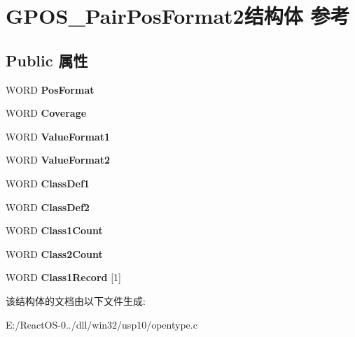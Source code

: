 \hypertarget{struct_g_p_o_s___pair_pos_format2}{}\section{G\+P\+O\+S\+\_\+\+Pair\+Pos\+Format2结构体 参考}
\label{struct_g_p_o_s___pair_pos_format2}
\subsection*{Public 属性}
\begin{DoxyCompactItemize}
\item 
\mbox{\label{struct_g_p_o_s___pair_pos_format2_a504959990c024546b68958e54cce5a03}} 
W\+O\+RD {\bfseries Pos\+Format}
\item 
\mbox{\label{struct_g_p_o_s___pair_pos_format2_a4a00fdc63eafb83e72490c04d5518b68}} 
W\+O\+RD {\bfseries Coverage}
\item 
\mbox{\label{struct_g_p_o_s___pair_pos_format2_af3979ab5cfe332226592ea0bc3e7ff12}} 
W\+O\+RD {\bfseries Value\+Format1}
\item 
\mbox{\label{struct_g_p_o_s___pair_pos_format2_a941d191d3abefa044a5f37ba96f48a50}} 
W\+O\+RD {\bfseries Value\+Format2}
\item 
\mbox{\label{struct_g_p_o_s___pair_pos_format2_a6f98a61a237d4c25869032eb7a8213af}} 
W\+O\+RD {\bfseries Class\+Def1}
\item 
\mbox{\label{struct_g_p_o_s___pair_pos_format2_ab7b6b67848b5fe52f2e373a9cb4209fd}} 
W\+O\+RD {\bfseries Class\+Def2}
\item 
\mbox{\label{struct_g_p_o_s___pair_pos_format2_a6c9fb8d6aad894b1a57b1e85516ff686}} 
W\+O\+RD {\bfseries Class1\+Count}
\item 
\mbox{\label{struct_g_p_o_s___pair_pos_format2_a084667b8deb1f9be411d7b717e6a3b76}} 
W\+O\+RD {\bfseries Class2\+Count}
\item 
\mbox{\label{struct_g_p_o_s___pair_pos_format2_a4b9cf602c0a188c673bc61448360d0f5}} 
W\+O\+RD {\bfseries Class1\+Record} \mbox{[}1\mbox{]}
\end{DoxyCompactItemize}


该结构体的文档由以下文件生成\+:\begin{DoxyCompactItemize}
\item 
E\+:/\+React\+O\+S-\/0../dll/win32/usp10/opentype.\+c\end{DoxyCompactItemize}
